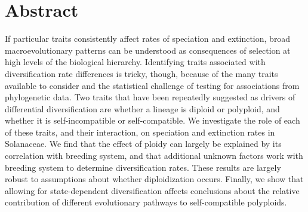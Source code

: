 \section{Abstract}

%

If particular traits consistently affect rates of speciation and extinction, broad macroevolutionary patterns can be understood as consequences of selection at high levels of the biological hierarchy.
Identifying traits associated with diversification rate differences is tricky, though, because of the many traits available to consider and the statistical challenge of testing for associations from phylogenetic data.
Two traits that have been repeatedly suggested as drivers of differential diversification are whether a lineage is diploid or polyploid, and whether it is self-incompatible or self-compatible.
We investigate the role of each of these traits, and their interaction, on speciation and extinction rates in Solanaceae.
We find that the effect of ploidy can largely be explained by its correlation with breeding system, and that additional unknown factors work with breeding system to determine diversification rates.
These results are largely robust to assumptions about whether diploidization occurs.
Finally, we show that allowing for state-dependent diversification affects conclusions about the relative contribution of different evolutionary pathways to self-compatible polyploids.
